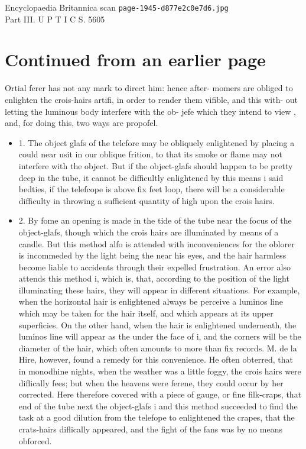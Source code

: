 \documentclass{article}
\begin{document}
\begin{center}
{\Large Encyclopaedia Britannica scan \texttt{page-1945-d877e2c0e7d6.jpg}}\\[0.5em]
Part III. U P T I C S. 5605
\end{center}
\section*{Continued from an earlier page}
Ortial ferer has not any mark to direct him: hence after- momers are obliged to enlighten the crois-hairs artifi, in order to render them vifible, and this with- out letting the luminous body interfere with the ob- jefe which they intend to view , and, for doing this, two ways are propofel.

\begin{itemize}
\item 1. The object glafs of the telcfore may be obliquely enlightened by placing a could near usit in our oblique frition, to that its smoke or flame may not interfere with the object. But if the object-glafs should happen to be pretty deep in the tube, it cannot be difficultly enlightened by this means i said bedties, if the telefcope is above fix feet loop, there will be a considerable difficulty in throwing a sufficient quantity of high upon the crois hairs.
\item 2. By fome an opening is made in the tide of the tube near the focus of the object-glafs, though which the crois hairs are illuminated by means of a candle. But this method alfo is attended with inconveniences for the oblorer is incommeded by the light being the near his eyes, and the hair harmless become liable to accidents through their expelled frustration. An error also attends this method i, which is, that, according to the position of the light illuminating these hairs, they will appear in different situations. For example, when the horizontal hair is enlightened always be perceive a luminos line which may be taken for the hair itself, and which appears at its upper superficies. On the other hand, when the hair is enlightened underneath, the luminos line will appear as the under the face of i, and the corners will be the diameter of the hair, which often amounts to more than fix records. M. de la Hire, however, found a remedy for this convenience. He often obterred, that in monodhine nights, when the weather was a little foggy, the crois hairs were diflically fees; but when the heavens were ferene, they could occur by her corrected. Here therefore covered with a piece of gauge, or fine filk-craps, that end of the tube next the object-glafs i and this method succeeded to find the task at a good dilution from the telefope to enlightened the crapes, that the crats-hairs diflically appeared, and the fight of the fans was by no means obforced.
\end{itemize}
\end{document}
